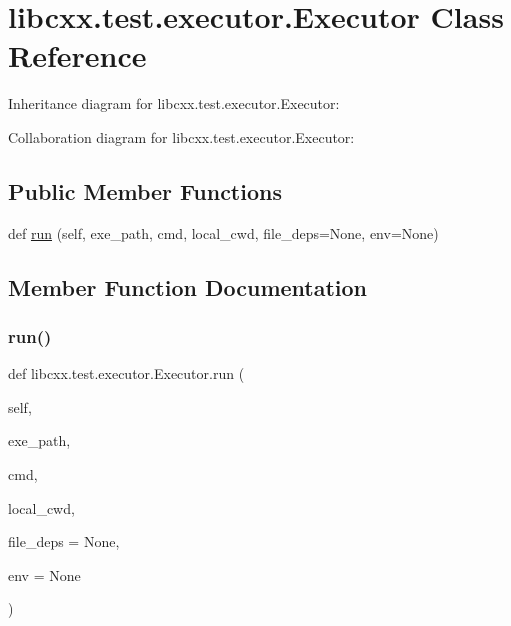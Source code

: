 \hypertarget{classlibcxx_1_1test_1_1executor_1_1_executor}{}\section{libcxx.\+test.\+executor.\+Executor Class Reference}
\label{classlibcxx_1_1test_1_1executor_1_1_executor}


Inheritance diagram for libcxx.\+test.\+executor.\+Executor\+:


Collaboration diagram for libcxx.\+test.\+executor.\+Executor\+:
\subsection*{Public Member Functions}
\begin{DoxyCompactItemize}
\item 
def \mbox{\hyperlink{classlibcxx_1_1test_1_1executor_1_1_executor_a5e0df4e96bb18e815b8cf77bb2e598d3}{run}} (self, exe\+\_\+path, cmd, local\+\_\+cwd, file\+\_\+deps=None, env=None)
\end{DoxyCompactItemize}


\subsection{Member Function Documentation}
\mbox{\label{classlibcxx_1_1test_1_1executor_1_1_executor_a5e0df4e96bb18e815b8cf77bb2e598d3}} 
\subsubsection{\texorpdfstring{run()}{run()}}
{\footnotesize\ttfamily def libcxx.\+test.\+executor.\+Executor.\+run (\begin{DoxyParamCaption}\item[{}]{self,  }\item[{}]{exe\+\_\+path,  }\item[{}]{cmd,  }\item[{}]{local\+\_\+cwd,  }\item[{}]{file\+\_\+deps = {\ttfamily None},  }\item[{}]{env = {\ttfamily None} }\end{DoxyParamCaption})}

